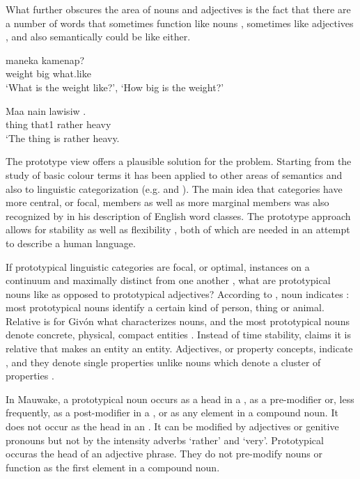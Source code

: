 What further obscures the area of nouns and adjectives is the fact that there are a number of words that sometimes function like nouns , sometimes like adjectives , and also semantically could be like either.

\ea%
\label{ex:3:x20}
\gll {} maneka kamenap? \\
weight big what.like\\
\glt`What is the weight like?', `How big is the weight?'
\z

\ea%
\label{ex:3:x21}
\gll Maa nain lawisiw . \\
thing that1 rather heavy\\
\glt`The thing is rather heavy.
\z

The prototype view offers a plausible solution for the problem. Starting from the study of basic colour terms \citep{BerlinEtAl1969} it has been applied to other areas of semantics and also to linguistic categorization (e.g.\citealt{Wierzbicka1986,Taylor1989} and \citealt{Frawley1992}). The main idea that categories have more central, or focal, members as well as more marginal members was also recognized by \citet{Crystal1967} in his description of English word classes. The prototype approach allows for stability as well as flexibility \citep[53]{Taylor1989}, both of which are needed in an attempt to describe a human language.

If prototypical linguistic categories are focal, or optimal, instances on a continuum \citep[321]{Seiler1978} and maximally distinct from one another \citep[709]{HopperEtAl1984}%
, what are prototypical nouns like as opposed to prototypical adjectives? According to \citet{Wierzbicka1986}, noun indicates : most prototypical nouns identify a certain kind of person, thing or animal. Relative  is for Giv\'on what characterizes nouns, and the most prototypical nouns denote concrete, physical, compact entities \citeyear[151]{Givon1984}. Instead of time stability, \citet[66]{Frawley1992} claims it is relative \textstyleEmphasizedWords{} that makes an entity an entity. Adjectives, or property concepts, indicate , and they denote single properties unlike nouns which denote a cluster of properties \citep{Wierzbicka1986}.

In Mauwake, a prototypical noun occurs as a head in a , as a pre-modifier or, less frequently, as a post-modifier in a , or as any element in a compound noun. It does not occur as the head in an . It can be modified by adjectives or genitive pronouns but not by the intensity adverbs  `rather' and  `very'. Prototypical \textstyleEmphasizedWords{ }occur\textstyleEmphasizedWords{ }as the head of an adjective phrase. They do not pre-modify nouns or function as the first element in a compound noun.


